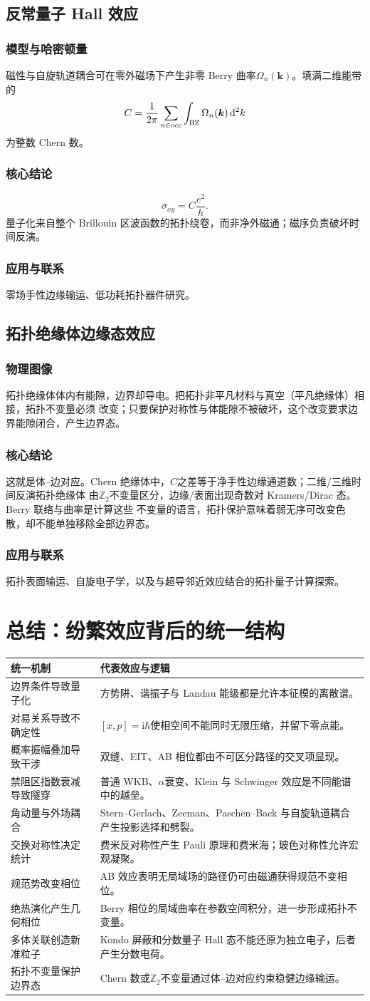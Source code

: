 \documentclass[12pt,a4paper,openany,fontset=fandol]{ctexrep}
\newcommand{\ii}{\mathrm{i}}
\newcommand{\Physical}{\subsection*{物理图像}}
\newcommand{\Model}{\subsection*{模型与哈密顿量}}
\newcommand{\Conclusion}{\subsection*{核心结论}}
\newcommand{\Application}{\subsection*{应用与联系}}
\begin{document}
\section{反常量子 Hall 效应}
\Model
磁性与自旋轨道耦合可在零外磁场下产生非零 Berry 曲率$\Omega_n(\bm k)$。填满二维能带的
\[
C=\frac{1}{2\pi}\sum_{n\in{\rm occ}}\int_{\rm BZ}\Omega_n(\bm k)\,\dd^2k
\]
为整数 Chern 数。
\Conclusion
\begin{equation}\sigma_{xy}=C\frac{e^2}{h}.\end{equation}
量子化来自整个 Brillouin 区波函数的拓扑绕卷，而非净外磁通；磁序负责破坏时间反演。
\Application
零场手性边缘输运、低功耗拓扑器件研究。

\section{拓扑绝缘体边缘态效应}
\Physical
拓扑绝缘体体内有能隙，边界却导电。把拓扑非平凡材料与真空（平凡绝缘体）相接，拓扑不变量必须
改变；只要保护对称性与体能隙不被破坏，这个改变要求边界能隙闭合，产生边界态。
\Conclusion
这就是体--边对应。Chern 绝缘体中，$C$之差等于净手性边缘通道数；二维/三维时间反演拓扑绝缘体
由$\mathbb Z_2$不变量区分，边缘/表面出现奇数对 Kramers/Dirac 态。Berry 联络与曲率是计算这些
不变量的语言，拓扑保护意味着弱无序可改变色散，却不能单独移除全部边界态。
\Application
拓扑表面输运、自旋电子学，以及与超导邻近效应结合的拓扑量子计算探索。

\chapter{总结：纷繁效应背后的统一结构}
\begin{longtable}{p{}p{}}
\toprule
统一机制 & 代表效应与逻辑\\
\midrule
\endhead
边界条件导致量子化 & 方势阱、谐振子与 Landau 能级都是允许本征模的离散谱。\\
对易关系导致不确定性 & $[x,p]=\ii\hbar$使相空间不能同时无限压缩，并留下零点能。\\
概率振幅叠加导致干涉 & 双缝、EIT、AB 相位都由不可区分路径的交叉项显现。\\
禁阻区指数衰减导致隧穿 & 普通 WKB、$\alpha$衰变、Klein 与 Schwinger 效应是不同能谱中的越垒。\\
角动量与外场耦合 & Stern--Gerlach、Zeeman、Paschen--Back 与自旋轨道耦合产生投影选择和劈裂。\\
交换对称性决定统计 & 费米反对称性产生 Pauli 原理和费米海；玻色对称性允许宏观凝聚。\\
规范势改变相位 & AB 效应表明无局域场的路径仍可由磁通获得规范不变相位。\\
绝热演化产生几何相位 & Berry 相位的局域曲率在参数空间积分，进一步形成拓扑不变量。\\
多体关联创造新准粒子 & Kondo 屏蔽和分数量子 Hall 态不能还原为独立电子，后者产生分数电荷。\\
拓扑不变量保护边界态 & Chern 数或$\mathbb Z_2$不变量通过体--边对应约束稳健边缘输运。\\
\bottomrule
\end{longtable}
\end{document}
